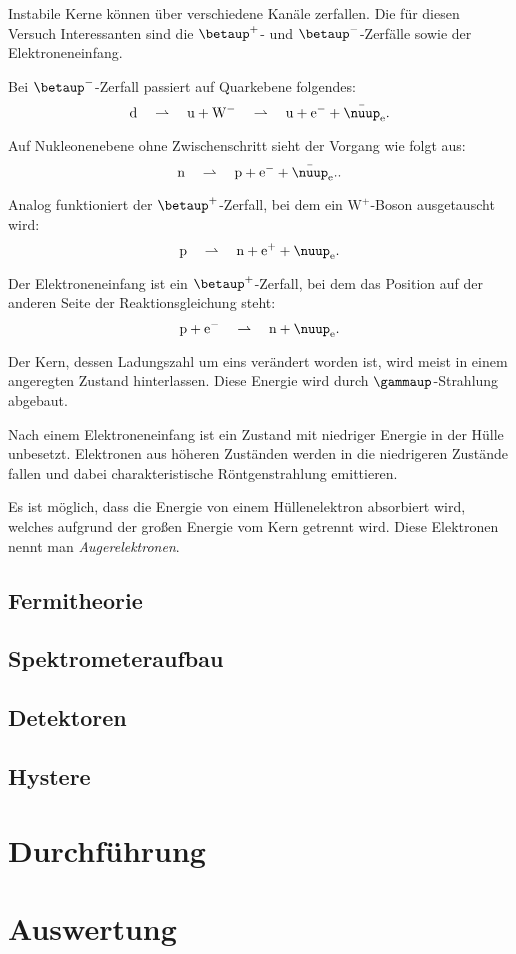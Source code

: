 \newcommand\betaplus{\betaup^+}
\newcommand\betaminus{\betaup^-}

Instabile Kerne können über verschiedene Kanäle zerfallen. Die für diesen
Versuch Interessanten sind die $\betaplus$- und $\betaminus$-Zerfälle sowie der
Elektroneneinfang.

Bei $\betaminus$-Zerfall passiert auf Quarkebene folgendes:
\[
    \mathrm d
    \quad\rightharpoonup\quad
    \mathrm u + \mathrm W^-
    \quad\rightharpoonup\quad
    \mathrm u + \mathrm e^- + \bar\nuup_{\mathrm e}.
\]

Auf Nukleonenebene ohne Zwischenschritt sieht der Vorgang wie folgt aus:
\[
    \mathrm n
    \quad\rightharpoonup\quad
    \mathrm p + \mathrm e^- + \bar\nuup_{\mathrm e}..
\]

Analog funktioniert der $\betaplus$-Zerfall, bei dem ein $\mathrm W^+$-Boson
ausgetauscht wird:
\[
    \mathrm p
    \quad\rightharpoonup\quad
    \mathrm n + \mathrm e^+ + \nuup_{\mathrm e}.
\]

Der Elektroneneinfang ist ein $\betaplus$-Zerfall, bei dem das Position auf der
anderen Seite der Reaktionsgleichung steht:
\[
    \mathrm p + \mathrm e^-
    \quad\rightharpoonup\quad
    \mathrm n + \nuup_{\mathrm e}.
\]

Der Kern, dessen Ladungszahl um eins verändert worden ist, wird meist in einem
angeregten Zustand hinterlassen. Diese Energie wird durch $\gammaup$-Strahlung
abgebaut.

Nach einem Elektroneneinfang ist ein Zustand mit niedriger Energie in der Hülle
unbesetzt. Elektronen aus höheren Zuständen werden in die niedrigeren Zustände
fallen und dabei charakteristische Röntgenstrahlung emittieren.

Es ist möglich, dass die Energie von einem Hüllenelektron absorbiert
wird, welches aufgrund der großen Energie vom Kern getrennt wird. Diese
Elektronen nennt man \emph{Augerelektronen}.

\section{Fermitheorie}

\section{Spektrometeraufbau}

\section{Detektoren}

\section{Hystere}

\chapter{Durchführung}

\chapter{Auswertung}


\IfFileExists{\bibliographyfile}{
    \printbibliography
}{}




